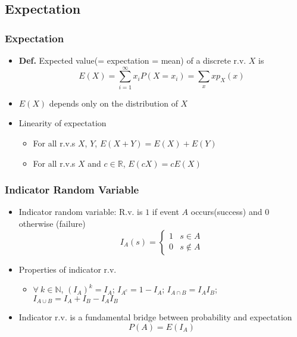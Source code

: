 \subsection{Expectation}

\subsubsection*{Expectation}
\begin{itemize}
    \item \textbf{Def.} Expected value(= expectation = mean) of a discrete r.v. $X$ is
    \begin{equation}
        E(X)=\sum_{i=1}^\infty x_iP(X=x_i)=\sum_{x}xp_X(x)
    \end{equation}
    \item $E(X)$ depends only on the distribution of $X$
    \item Linearity of expectation
    \begin{itemize}
        \item For all r.v.s $X$, $Y$, $E(X+Y)=E(X)+E(Y)$
        \item For all r.v.s $X$ and $c\in\mathbb{R}$, $E(cX)=cE(X)$
    \end{itemize}
\end{itemize}

\subsubsection*{Indicator Random Variable}
\begin{itemize}
    \item Indicator random variable: R.v. is $1$ if event $A$ occurs(success) and $0$ otherwise (failure)
    \begin{equation}
        I_A(s)=\begin{cases}
            1 & s\in A\\
            0 & s\notin A
        \end{cases}
    \end{equation}
    \item Properties of indicator r.v.
    \begin{itemize}
        \item $\forall~k\in\mathbb{N}$, $(I_A)^k=I_A$; $I_{A^c}=1-I_A$; $I_{A\cap B}=I_AI_B$; $I_{A\cup B}=I_A+I_B-I_AI_B$
    \end{itemize}
    \item Indicator r.v. is a fundamental bridge between probability and expectation
    \begin{equation}
        P(A)=E(I_A)
    \end{equation}
\end{itemize}
\clearpage

